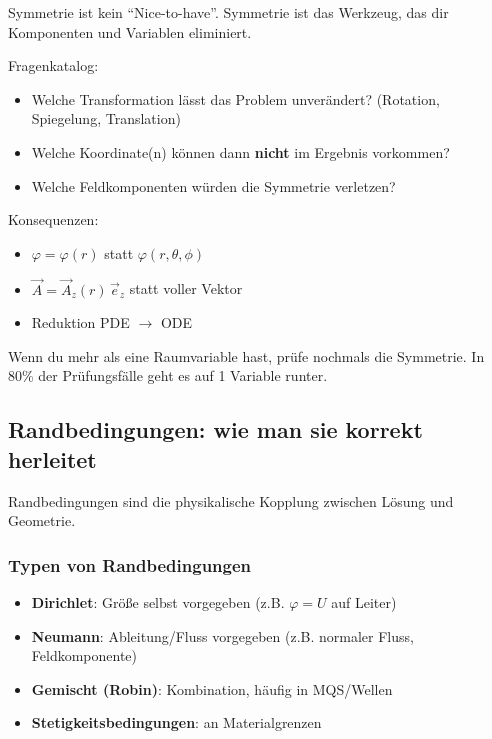 \documentclass[a4paper]{article}
\newcommand{\imp}[1]{{\color{accent}\bfseries #1}}
\newcommand{\A}{\vec A}
\begin{document}
\begin{merke}
Symmetrie ist kein ``Nice-to-have''. Symmetrie ist das Werkzeug, das dir Komponenten und Variablen eliminiert.
\end{merke}

Fragenkatalog:
\begin{itemize}
  \item Welche Transformation lässt das Problem unverändert? (Rotation, Spiegelung, Translation)
  \item Welche Koordinate(n) können dann \imp{nicht} im Ergebnis vorkommen?
  \item Welche Feldkomponenten würden die Symmetrie verletzen?
\end{itemize}

Konsequenzen:
\begin{itemize}
  \item $\varphi=\varphi(r)$ statt $\varphi(r,\theta,\phi)$
  \item $\A=\A_z(r)\,\vec e_z$ statt voller Vektor
  \item Reduktion PDE $\rightarrow$ ODE
\end{itemize}

\begin{checkitem}
Wenn du mehr als eine Raumvariable hast, prüfe nochmals die Symmetrie. In 80\% der Prüfungsfälle geht es auf 1 Variable runter.
\end{checkitem}

\subsection{Randbedingungen: wie man sie korrekt herleitet}

Randbedingungen sind die physikalische Kopplung zwischen Lösung und Geometrie.

\subsubsection{Typen von Randbedingungen}
\begin{itemize}
  \item \imp{Dirichlet}: Größe selbst vorgegeben (z.B. $\varphi = U$ auf Leiter)
  \item \imp{Neumann}: Ableitung/Fluss vorgegeben (z.B. normaler Fluss, Feldkomponente)
  \item \imp{Gemischt (Robin)}: Kombination, häufig in MQS/Wellen
  \item \imp{Stetigkeitsbedingungen}: an Materialgrenzen
\end{itemize}
\end{document}

